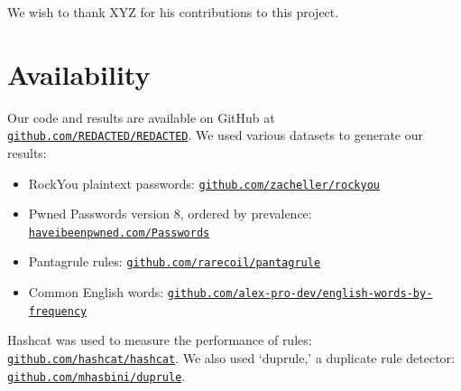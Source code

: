\documentclass{article}
\begin{document}
We wish to thank XYZ for his contributions to this project.

\section*{Availability}

Our code and results are available on GitHub at
\texttt{\href{https://github.com/REDACTED/REDACTED}
{github.com/REDACTED/REDACTED}}. We used various datasets
to generate our results:

\begin{itemize}
\item RockYou plaintext passwords:
\texttt{\href{https://github.com/zacheller/rockyou}
{github.com/zacheller/rockyou}}
\item Pwned Passwords version 8, ordered by prevalence:\newline
\texttt{\href{https://haveibeenpwned.com/Passwords}
{haveibeenpwned.com/Passwords}}
\item Pantagrule rules:
\texttt{\href{https://github.com/rarecoil/pantagrule}
{github.com/rarecoil/pantagrule}}
\item Common English words:\newline
\texttt{\href{https://github.com/alex-pro-dev/english-words-by-frequency}
{github.com/alex-pro-dev/english-words-by-frequency}}
\end{itemize}

Hashcat was used to measure the performance of rules:\newline
\texttt{\href{https://github.com/hashcat/hashcat}{github.com/hashcat/hashcat}}.
We also used
`duprule,' a duplicate rule detector:
\texttt{\href{https://github.com/mhasbini/duprule}
{github.com/mhasbini/duprule}}.

\medskip

\printbibliography
\end{document}
